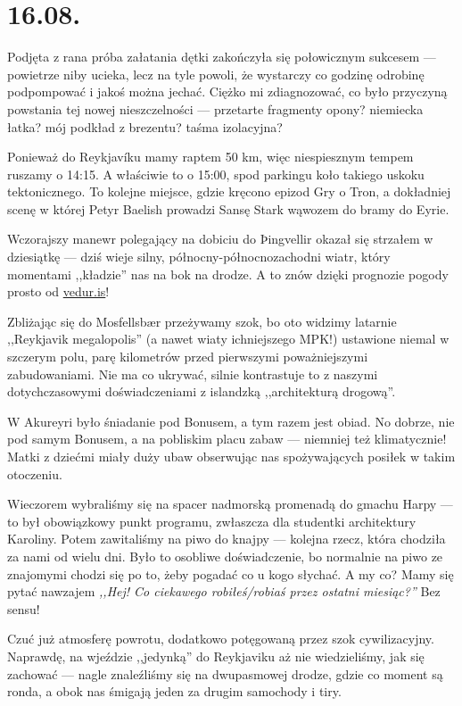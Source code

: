 \chapter*{16.08.}

Podjęta z rana próba załatania dętki zakończyła się połowicznym sukcesem --- powietrze niby ucieka, lecz na tyle powoli, że wystarczy co godzinę odrobinę podpompować i jakoś można jechać. Ciężko mi zdiagnozować, co było przyczyną powstania tej nowej nieszczelności --- przetarte fragmenty opony? niemiecka łatka? mój podkład z brezentu? taśma izolacyjna?

Ponieważ do Reykjavíku mamy raptem 50 km, więc niespiesznym tempem ruszamy o 14:15. A właściwie to o 15:00, spod parkingu koło takiego uskoku tektonicznego. To kolejne miejsce, gdzie kręcono epizod Gry o Tron, a dokładniej scenę w której Petyr Baelish prowadzi Sansę Stark wąwozem do bramy do Eyrie.

Wczorajszy manewr polegający na dobiciu do Þingvellir okazał się strzałem w dziesiątkę --- dziś wieje silny, północny-północnozachodni wiatr, który momentami ,,kładzie'' nas na bok na drodze. A to znów dzięki prognozie pogody prosto od \url{vedur.is}!

Zbliżając się do Mosfellsbær przeżywamy szok, bo oto widzimy latarnie ,,Reykjavik megalopolis'' (a nawet wiaty ichniejszego MPK!) ustawione niemal w szczerym polu, parę kilometrów przed pierwszymi poważniejszymi zabudowaniami. Nie ma co ukrywać, silnie kontrastuje to z naszymi dotychczasowymi doświadczeniami z islandzką ,,architekturą drogową''.


W Akureyri było śniadanie pod Bonusem, a tym razem jest obiad. No dobrze, nie pod samym Bonusem, a na pobliskim placu zabaw --- niemniej też klimatycznie! Matki z dziećmi miały duży ubaw obserwując nas spożywających posiłek w takim otoczeniu.

Wieczorem wybraliśmy się na spacer nadmorską promenadą do gmachu Harpy --- to był obowiązkowy punkt programu, zwłaszcza dla studentki architektury Karoliny. Potem zawitaliśmy na piwo do knajpy --- kolejna rzecz, która chodziła za nami od wielu dni. Było to osobliwe doświadczenie, bo normalnie na piwo ze znajomymi chodzi się po to, żeby pogadać co u kogo słychać. A my co? Mamy się pytać nawzajem \emph{,,Hej! Co ciekawego robiłeś/robiaś przez ostatni miesiąc?''} Bez sensu!

Czuć już atmosferę powrotu, dodatkowo potęgowaną przez szok cywilizacyjny. Naprawdę, na wjeździe ,,jedynką'' do Reykjaviku aż nie wiedzieliśmy, jak się zachować --- nagle znaleźliśmy się na dwupasmowej drodze, gdzie co moment są ronda, a obok nas śmigają jeden za drugim samochody i tiry.

